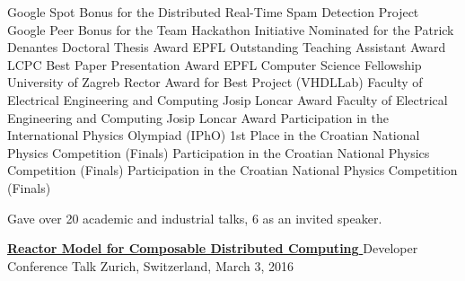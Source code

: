 \documentclass[9pt]{article}
\begin{document}
\bigskip

\medskip
\medskip
\medskip


\noindent Google Spot Bonus for the Distributed Real-Time Spam Detection Project
\newline\noindent Google Peer Bonus for the Team Hackathon Initiative 
\newline\noindent Nominated for the Patrick Denantes Doctoral Thesis Award 
\newline\noindent EPFL Outstanding Teaching Assistant Award 
\newline\noindent LCPC Best Paper Presentation Award 
\newline\noindent EPFL Computer Science Fellowship 
\newline\noindent University of Zagreb Rector Award for Best Project (VHDLLab)
\newline\noindent Faculty of Electrical Engineering and Computing Josip Loncar Award
\newline\noindent Faculty of Electrical Engineering and Computing Josip Loncar Award
\newline\noindent Participation in the International Physics Olympiad (IPhO)
\newline\noindent 1st Place in the Croatian National Physics Competition (Finals)
\newline\noindent Participation in the Croatian National Physics Competition (Finals)
\newline\noindent Participation in the Croatian National Physics Competition (Finals)

\bigskip




\medskip
{}

\vspace{-0.02in}

\noindent
Gave over 20 academic and industrial talks, 6 as an invited speaker.
\newline

\noindent\href{https://cfp-vdz.exteso.com/program/speaker/aleksandar_prokopec.html}
{\bf Reactor Model for Composable Distributed Computing }
\vspace{-0.03in}
\newline\noindent Developer Conference Talk
\dates{}
\linebreak\noindent Zurich, Switzerland, March 3, 2016
\bigskip
\end{document}
